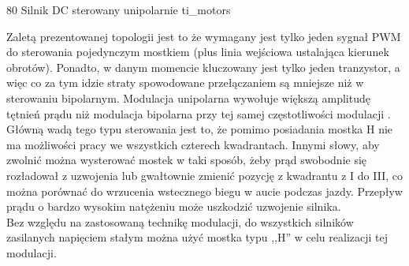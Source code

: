 	{80}
	{Silnik DC sterowany unipolarnie}
	{ti_motors}

Zaletą prezentowanej topologii jest to że wymagany jest tylko jeden sygnał PWM do sterowania pojedynczym mostkiem (plus linia wejściowa ustalająca kierunek obrotów). Ponadto, w danym momencie kluczowany jest tylko jeden tranzystor, a więc co za tym idzie straty spowodowane przełączaniem są mniejsze niż w sterowaniu bipolarnym. Modulacja unipolarna wywołuje większą amplitudę tętnień prądu niż modulacja bipolarna przy tej samej częstotliwości modulacji \cite{zawirski}. \\

Główną wadą tego typu sterowania jest to, że pomimo posiadania mostka H nie ma możliwości pracy we wszystkich czterech kwadrantach. Innymi słowy, aby zwolnić można wysterować mostek w taki sposób, żeby prąd swobodnie się rozładował z uzwojenia lub gwałtownie zmienić pozycję z kwadrantu z I do III, co można porównać do wrzucenia wstecznego biegu w aucie podczas jazdy. Przepływ prądu o bardzo wysokim natężeniu może uszkodzić uzwojenie silnika. \\

Bez względu na zastosowaną technikę modulacji, do wszystkich silników zasilanych napięciem stałym można użyć mostka typu ,,H'' w celu realizacji tej modulacji.





